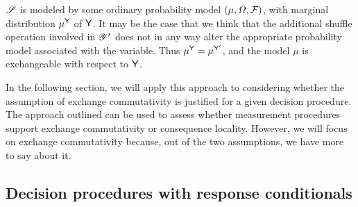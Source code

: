 $\mathscr{S}$ is modeled by some ordinary probability model $(\mu,\Omega,\mathcal{F})$, with marginal distribution $\mu^{\mathsf{Y}}$ of $\mathsf{Y}$. It may be the case that we think that the additional shuffle operation involved in $\mathscr{Y}'$ does not in any way alter the appropriate probability model associated with the variable. Thus $\mu^{\mathsf{Y}}=\mu^{\mathsf{Y}'}$, and the model $\mu$ is exchangeable with respect to $\mathsf{Y}$.

In the following section, we will apply this approach to considering whether the assumption of exchange commutativity is justified for a given decision procedure. The approach outlined can be used to assess whether measurement procedures support exchange commutativity or consequence locality. However, we will focus on exchange commutativity because, out of the two assumptions, we have more to say about it.


\subsection{Decision procedures with response conditionals}

